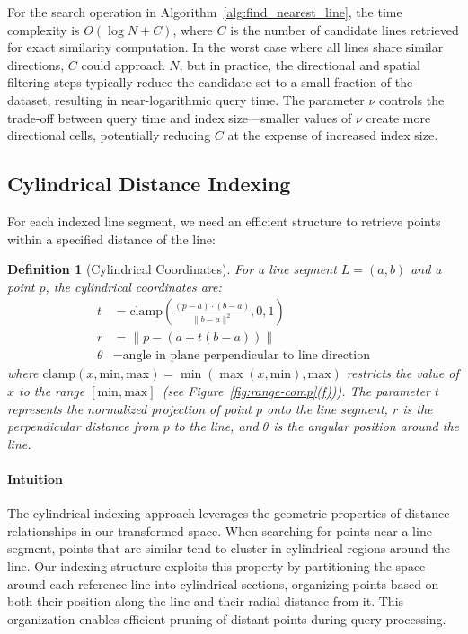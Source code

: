 \documentclass[numbers,sort]{article}
\newtheorem{definition}{Definition}
\begin{document}
For the search operation in Algorithm~\ref{alg:find_nearest_line}, the time complexity is $O(\log N + C)$, where $C$ is the number of candidate lines retrieved for exact similarity computation. In the worst case where all lines share similar directions, $C$ could approach $N$, but in practice, the directional and spatial filtering steps typically reduce the candidate set to a small fraction of the dataset, resulting in near-logarithmic query time. The parameter $\nu$ controls the trade-off between query time and index size—smaller values of $\nu$ create more directional cells, potentially reducing $C$ at the expense of increased index size.

\subsection{Cylindrical Distance Indexing}

For each indexed line segment, we need an efficient structure to retrieve points within a specified distance of the line:

\begin{definition}[Cylindrical Coordinates]
For a line segment $L = (a, b)$ and a point $p$, the cylindrical coordinates are:
\begin{align}
t &= \text{clamp}\left(\frac{(p-a) \cdot (b-a)}{\|b-a\|^2}, 0, 1\right) \\
r &= \|p - (a + t(b-a))\| \\
\theta &= \text{angle in plane perpendicular to line direction}
\end{align}
where $\text{clamp}(x, \text{min}, \text{max}) = \min(\max(x, \text{min}), \text{max})$ restricts the value of $x$ to the range $[\text{min}, \text{max}]$~(see Figure~\hyperref[fig:range-comp]{\ref*{fig:range-comp}(f)})). The parameter $t$ represents the normalized projection of point $p$ onto the line segment, $r$ is the perpendicular distance from $p$ to the line, and $\theta$ is the angular position around the line.
\end{definition}

\paragraph{Intuition} The cylindrical indexing approach leverages the geometric properties of distance relationships in our transformed space. When searching for points near a line segment, points that are similar tend to cluster in cylindrical regions around the line. Our indexing structure exploits this property by partitioning the space around each reference line into cylindrical sections, organizing points based on both their position along the line and their radial distance from it. This organization enables efficient pruning of distant points during query processing.
\end{document}
